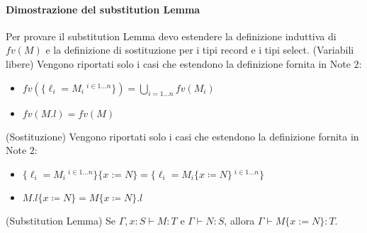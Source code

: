 \paragraph{Dimostrazione del substitution Lemma}
Per provare il substitution Lemma devo estendere la definizione induttiva di $fv(M)$ e la definizione di sostituzione per i tipi 
record e i tipi select.
(Variabili libere)
	Vengono riportati solo i casi che estendono la definizione fornita in Note $2$:
	\begin{itemize}
		\item $fv(\{\ell_i = M_i\ ^{i \in 1 \dots n} \}) = \bigcup_{i = 1 \dots n} fv(M_i)$
		\item $fv(M.l) = fv(M)$
	\end{itemize}


(Sostituzione)
	Vengono riportati solo i casi che estendono la definizione fornita in Note $2$:
	\begin{itemize}
		\item $\{\ell_i = M_i\ ^{i \in 1 \dots n} \} \{x := N\} = \{\ell_i = M_i \{x \coloneqq N\}\ ^{i \in 1 \dots n} \}$
		\item $M.l\{x \coloneqq N \} = M\{x \coloneqq N \}.l$
	\end{itemize}



(Substitution Lemma)
Se $\Gamma, x : S \vdash M : T$ e $\Gamma \vdash N : S$, allora $\Gamma \vdash M\{x := N\}:T.$	


